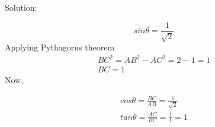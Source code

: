\documentclass{article}
\begin{document}
\begin{enumerate}
        Solution:

        \[ sin\theta = \frac{1}{\sqrt{2}} \]
        Applying Pythagorus theorem
        \[
        \begin{aligned}
          BC^{2} = AB^{2} - AC^{2} = 2 - 1 = 1 \\
          BC = 1
        \end{aligned}
        \]
        Now,

        \[
        \begin{aligned}
          cos\theta = \frac{BC}{AB} = \frac{1}{\sqrt{2}} \\
          tan\theta = \frac{AC}{BC} = \frac{1}{1} = 1
        \end{aligned}
        \]

\end{enumerate}
\end{document}
